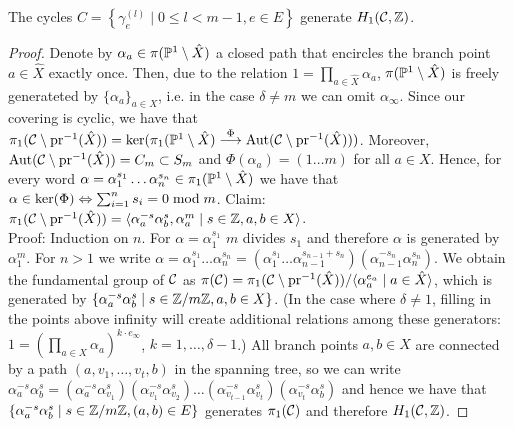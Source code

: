 \documentclass[main.tex]{subfiles}
\begin{document}
  \begin{thm}\label{thm:gen_set}
   The cycles $C = \left\{  \gamma_{e}^{(l)}  \mid  0 \le l <m-1,  e \in E  \right\}$ generate $\homo$.
  \end{thm}
  \begin{proof}
  Denote by $\alpha_a \in \pi(\P^1 \setminus \hat{X})$ a closed path that encircles the branch point $a \in \hat{X}$ exactly once. Then,  due to the relation $1 = \prod_{a \in \hat{X}} \alpha_a$,
  $\pi(\P^1 \setminus \hat{X})$ is freely generateted by $\{ \alpha_a \}_{a \in X}$, i.e. in the case $\delta \ne m$ we can omit $\alpha_{\infty}$. \abstand
  Since our covering is cyclic, we have that $
  \pi_1(\cu \setminus \pr^{-1}(\hat{X})) = \ker(\pi_1(\P^1 \setminus \hat{X}) \overset{\Phi}{\To} \Aut(\cu \setminus \pr^{-1}(\hat{X})))$. Moreover, $\Aut(\cu \setminus \pr^{-1}(\hat{X})) = C_m
  \subset S_m$
  and $\Phi(\alpha_a) = (1 \dots m)$ for all $a \in X$. Hence, for every word $\alpha = \alpha_1^{s_1}\dots \alpha_n^{s_n} \in \pi_1(\P^1 \setminus \hat{X})$ we have that
  $\alpha \in \ker(\Phi) \eq \sum_{i=1}^n s_i = 0 \bmod m$. \abstand
  Claim: $\pi_1(\cu \setminus \pr^{-1}(\hat{X})) = \langle  \alpha_a^{-s} \alpha_b^{s},  \alpha_a^m   \mid  s \in \Z, a,b \in X  \rangle$. \\
  Proof: Induction on $n$. For $\alpha = \alpha_1^{s_1}$ $m$ divides $s_1$ and therefore $\alpha$ is generated by $\alpha_1^m$. For $n > 1$ we write
  $\alpha = \alpha_1^{s_1}\dots \alpha_n^{s_n} = (\alpha_1^{s_1} \dots \alpha_{n-1}^{s_{n-1}+s_n})(\alpha_{n-1}^{-s_n}\alpha_n^{s_n})$. \abstand
  We obtain the fundamental group of $\cu$ as
  $\pi(\cu) = \pi_1(\cu \setminus \pr^{-1}(\hat{X})) / \langle  \alpha_a^{e_a}  \mid  a \in \hat{X}  \rangle$, which is generated by
  $\{  \alpha_a^{-s} \alpha_b^{s}  \mid  s \in \Z/m\Z,  a,b \in X  \}$. (In the case where $\delta \ne 1$, filling in the points above infinity will create additional relations among
  these generators:
  $1 = (\prod_{a \in X} \alpha_a)^{k \cdot e_{\infty}}$, $k = 1,\dots,\delta-1$.) \abstand
  All branch points $a,b \in X$ are connected by a path $(a,v_1,\dots,v_t,b)$ in the spanning tree, so we can write $\alpha_a^{-s} \alpha_b^{s} = (\alpha_a^{-s}\alpha_{v_1}^{s})
  (\alpha_{v_1}^{-s}\alpha_{v_2}^{s})\dots(\alpha_{v_{t-1}}^{-s}\alpha_{v_t}^{s})(\alpha_{v_t}^{-s}\alpha_b^{s})$ and hence we have that
  $\{ \alpha_a^{-s} \alpha_b^{s}  \mid  s \in \Z/m\Z,  (a,b) \in E \}$ generates $\pi_1(\cu)$ and therefore $\homo$. \abstand

\end{proof}
\end{document}
